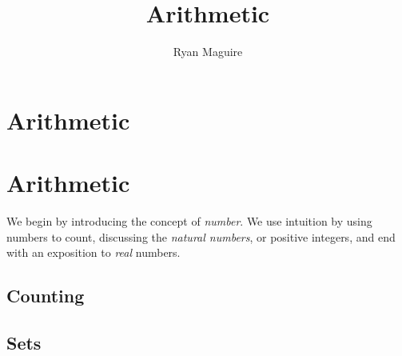 \documentclass[crop=false,class=book,oneside]{standalone}                      %
\begin{document}
    \ifx\ifmain\undefined
        \title{Arithmetic}
        \author{Ryan Maguire}
        \date{\vspace{-5ex}}
        \maketitle
        \tableofcontents
        \chapter*{Arithmetic}
        \setcounter{chapter}{1}
    \else
        \chapter{Arithmetic}
    \fi
    We begin by introducing the concept of \textit{number}. We use
    intuition by using numbers to count, discussing the
    \textit{natural numbers}, or positive integers, and end
    with an exposition to \textit{real} numbers.
    \section{Counting}
    \section{Sets}
\end{document}
